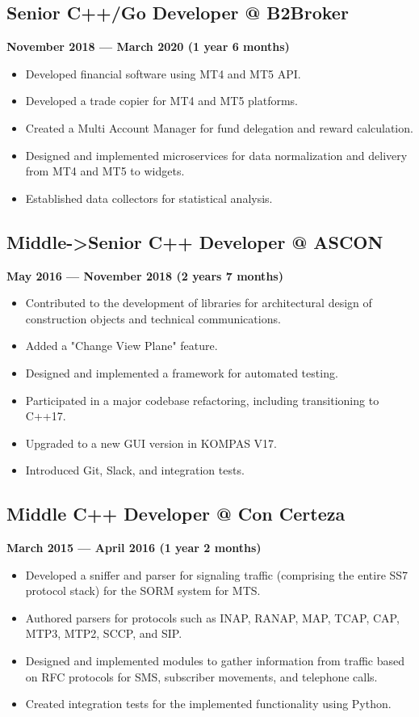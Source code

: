 \documentclass[a4paper,12pt]{article}
\begin{document}
\subsection*{Senior C++/Go Developer @ B2Broker}
\textbf{November 2018 — March 2020 (1 year 6 months)}
\begin{itemize}
    \item Developed financial software using MT4 and MT5 API.
    \item Developed a trade copier for MT4 and MT5 platforms.
    \item Created a Multi Account Manager for fund delegation and reward calculation.
    \item Designed and implemented microservices for data normalization and delivery from MT4 and MT5 to widgets.
    \item Established data collectors for statistical analysis.
\end{itemize}

\subsection*{Middle->Senior C++ Developer @ ASCON}
\textbf{May 2016 — November 2018 (2 years 7 months)}
\begin{itemize}
    \item Contributed to the development of libraries for architectural design of construction objects and technical communications.
    \item Added a "Change View Plane" feature.
    \item Designed and implemented a framework for automated testing.
    \item Participated in a major codebase refactoring, including transitioning to C++17.
    \item Upgraded to a new GUI version in KOMPAS V17.
    \item Introduced Git, Slack, and integration tests.
\end{itemize}

\subsection*{Middle C++ Developer @ Con Certeza}
\textbf{March 2015 — April 2016 (1 year 2 months)}
\begin{itemize}
    \item Developed a sniffer and parser for signaling traffic (comprising the entire SS7 protocol stack) for the SORM system for MTS.
    \item Authored parsers for protocols such as INAP, RANAP, MAP, TCAP, CAP, MTP3, MTP2, SCCP, and SIP.
    \item Designed and implemented modules to gather information from traffic based on RFC protocols for SMS, subscriber movements, and telephone calls.
    \item Created integration tests for the implemented functionality using Python.
\end{itemize}
\end{document}
